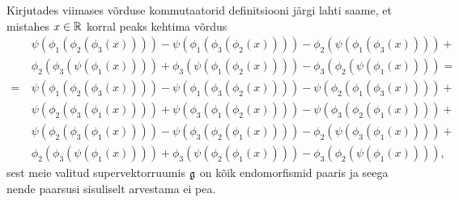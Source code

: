 \begin{markus}
    Kirjutades viimases võrduse kommutaatorid definitsiooni järgi
    lahti saame, et mistahes $x \in \mathbb{R}$ korral peaks kehtima võrdus
    \begin{align*}
        &\psi \left( \phi_1 \left( \phi_2 \left( \phi_3
            \left( x \right) \right) \right) \right) -
        \psi \left( \phi_1 \left( \phi_3 \left( \phi_2
            \left( x \right) \right) \right) \right) -
        \phi_2 \left( \psi \left( \phi_1 \left( \phi_3
            \left( x \right) \right) \right) \right) + \\
        &\phi_2 \left( \phi_3 \left( \psi \left( \phi_1
            \left( x \right) \right) \right) \right) +
        \phi_3 \left( \psi \left( \phi_1 \left( \phi_2
            \left( x \right) \right) \right) \right) -
        \phi_3 \left( \phi_2 \left( \psi \left( \phi_1
            \left( x \right) \right) \right) \right) = \\
        =\ &\psi \left( \phi_1 \left( \phi_2 \left(
            \phi_3 \left( x \right) \right) \right) \right) -
        \psi \left( \phi_1 \left( \phi_3 \left(
            \phi_2 \left( x \right) \right) \right) \right) -
        \psi \left( \phi_2 \left( \phi_1 \left(
            \phi_3 \left( x \right) \right) \right) \right) + \\
        &\psi \left( \phi_2 \left( \phi_3 \left(
            \phi_1 \left( x \right) \right) \right) \right) +
        \psi \left( \phi_3 \left( \phi_1 \left(
            \phi_2 \left( x \right) \right) \right) \right) -
        \psi \left( \phi_3 \left( \phi_2 \left(
            \phi_1 \left( x \right) \right) \right) \right) + \\
        &\psi \left( \phi_2 \left( \phi_3 \left(
            \phi_1 \left( x \right) \right) \right) \right) -
        \psi \left( \phi_3 \left( \phi_2 \left(
            \phi_1 \left( x \right) \right) \right) \right) -
        \phi_2 \left( \psi \left( \phi_3 \left(
            \phi_1 \left( x \right) \right) \right) \right) + \\
        &\phi_2 \left( \phi_3 \left( \psi \left(
            \phi_1 \left( x \right) \right) \right) \right) +
        \phi_3 \left( \psi \left( \phi_2 \left(
            \phi_1 \left( x \right) \right) \right) \right) -
        \phi_3 \left( \phi_2 \left( \psi \left(
            \phi_1 \left( x \right) \right) \right) \right),
    \end{align*}
    sest meie valitud supervektorruumis $\mathfrak{g}$ on kõik endomorfismid
    paaris ja seega nende paarsusi sisuliselt arvestama ei pea.


\end{markus}

